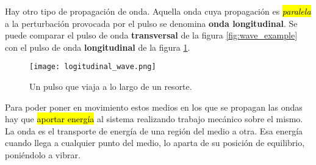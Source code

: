 Hay otro tipo de propagación de onda. Aquella onda cuya propagación es \hl{\textit{paralela}} a la perturbación provocada por el pulso se denomina \textbf{onda longitudinal}. Se puede comparar el pulso de onda \textbf{transversal} de la figura \ref{fig:wave_example} con el pulso de onda \textbf{longitudinal} de la figura \ref{fig:longitudinal_wave}.

\begin{figure}[ht]
  \centering
  \texttt{[image: logitudinal\_wave.png]}
  \caption{Un pulso que viaja a lo largo de un resorte.}
  \label{fig:longitudinal_wave}
\end{figure}

Para poder poner en movimiento estos medios en los que se propagan las ondas hay que \hl{aportar energía} al sistema realizando trabajo mecánico sobre el mismo. La onda es el transporte de energía de una región del medio a otra. Esa energía cuando llega a cualquier punto del medio, lo aparta de su posición de equilibrio, poniéndolo a vibrar. 









